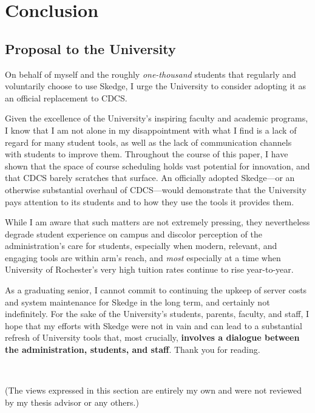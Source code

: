 
\chapter{Conclusion}

\vspace{-20pt}
\section{Proposal to the University}

On behalf of myself and the roughly \emph{one-thousand} students that regularly and voluntarily choose to use Skedge, I urge the University to consider adopting it as an official replacement to CDCS.

Given the excellence of the University's inspiring faculty and academic programs, I know that I am not alone in my disappointment with what I find is a lack of regard for many student tools, as well as the lack of communication channels with students to improve them. Throughout the course of this paper, I have shown that the space of course scheduling holds vast potential for innovation, and that CDCS barely scratches that surface. An officially adopted Skedge---or an otherwise substantial overhaul of CDCS---would demonstrate that the University pays attention to its students and to how they use the tools it provides them.

While I am aware that such matters are not extremely pressing, they nevertheless degrade student experience on campus and discolor perception of the administration's care for students, especially when modern, relevant, and engaging tools are within arm's reach, and \emph{most} especially at a time when University of Rochester's very high tuition rates continue to rise year-to-year.

As a graduating senior, I cannot commit to continuing the upkeep of server costs and system maintenance for Skedge in the long term, and certainly not indefinitely. For the sake of the University's students, parents, faculty, and staff, I hope that my efforts with Skedge were not in vain and can lead to a substantial refresh of University tools that, most crucially, \textbf{involves a dialogue between the administration, students, and staff}. Thank you for reading.

\\
\vspace{10pt}

\noindent (The views expressed in this section are entirely my own and were not reviewed by my thesis advisor or any others.)

